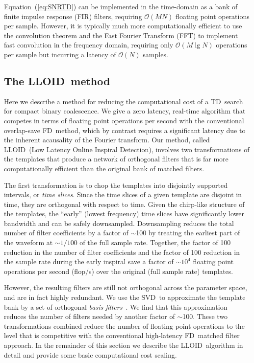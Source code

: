 \documentclass[preprint2]{aastex}
\newcommand{\tmpsamps}{\ensuremath{N}}
\newcommand{\numtmps}{\ensuremath{M}}
\newcommand{\SVD}{SVD}%
\newcommand{\fir}{FIR}%
\newcommand{\fft}{FFT}%
\newcommand{\flops}{flop/s}
\newcommand{\lloid}{LLOID}%
\newcommand{\TD}{TD}%
\newcommand{\FD}{FD}%
\begin{document}
Equation~(\ref{eq:SNRTD}) can be implemented in the time-domain as a bank of
finite impulse response (\fir) filters, requiring $\mathcal O(\numtmps
\tmpsamps)$ floating point operations per sample.  However, it is typically
much more computationally efficient to use the convolution theorem and the
Fast Fourier Transform (\fft) to implement fast convolution in the frequency
domain, requiring only
$\mathcal O(\numtmps \lg \tmpsamps)$ operations per sample but incurring
a latency of $\mathcal O(\tmpsamps)$ samples.


\subsection{The \lloid\ method}

Here we describe a method for reducing the computational cost of a \TD\ search
for compact binary coalescence.  We give a zero latency, real-time algorithm
that competes in terms of floating point operations per second with the
conventional overlap-save \FD\ method, which by contrast requires a significant latency due
to the inherent acausality of the Fourier transform.  Our method, called \lloid\
(Low Latency Online Inspiral Detection), involves two transformations of the
templates that produce a network of orthogonal filters that is far more
computationally efficient than the original bank of matched filters.

The first transformation is to chop the templates into disjointly supported
intervals, or \emph{time slices}.  Since the time slices of a given template
are disjoint in time, they are orthogonal with respect to time.  Given the
chirp-like structure of the templates, the ``early'' (lowest frequency) time
slices have significantly lower bandwidth and can be safely downsampled.
Downsampling reduces the total number of filter coefficients by a factor of
$\sim$100 by treating the earliest part of the waveform at $\sim$$1/100$ of
the full sample rate.  Together, the factor of 100 reduction in the number of
filter coefficients and the factor of 100 reduction in the sample rate during the early inspiral save a
factor of $\sim$$10^4$ floating point operations per second (\flops) over the
original (full sample rate) templates.

However, the resulting filters are still not
orthogonal across the parameter space, and are in fact highly redundant.
We use the \SVD\ to approximate the template bank by a set of orthogonal
\emph{basis filters}~\citep{Cannon:2010p10398}.  We find that this approximation
reduces the number of filters needed by another factor of $\sim$100.  These two
transformations combined reduce the number of floating point operations
to the level that is competitive with the conventional high-latency \FD\
matched filter approach.  In the remainder of this section we describe the
\lloid\ algorithm in detail and provide some basic computational cost scaling.
\end{document}
